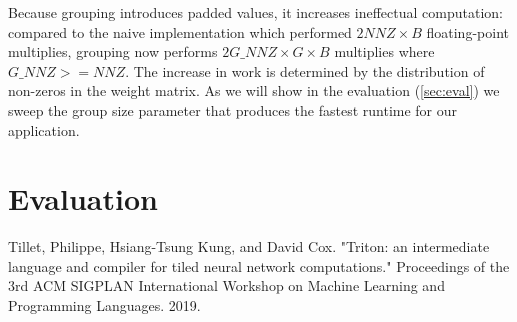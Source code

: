 \documentclass[conference]{IEEEtran}
\begin{document}
Because grouping introduces padded values, it increases ineffectual computation: compared to the naive implementation which performed $2NNZ \times B$ floating-point multiplies,
grouping now performs $2G\_NNZ \times G \times B$ multiplies where $G\_NNZ >= NNZ$.
The increase in work is determined by the distribution of non-zeros in the weight matrix.
As we will show in the evaluation (\autoref{sec:eval})
we sweep the group size parameter that produces the fastest runtime for our application.

\section{Evaluation}
\label{sec:eval}


\begin{thebibliography}{00}
 Tillet, Philippe, Hsiang-Tsung Kung, and David Cox. "Triton: an intermediate language and compiler for tiled neural network computations." Proceedings of the 3rd ACM SIGPLAN International Workshop on Machine Learning and Programming Languages. 2019.
\end{thebibliography}
\vspace{12pt}
\end{document}
